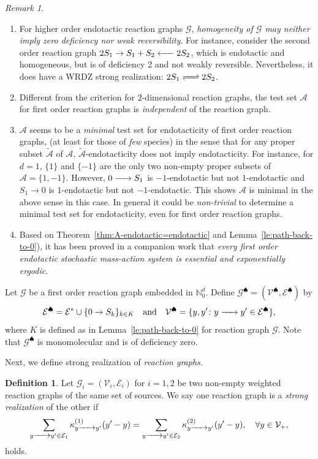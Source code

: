 \documentclass[10pt]{amsart}
\numberwithin{equation}{section}
\theoremstyle{plain}
\theoremstyle{definition}
\newtheorem{definition}[theorem]{Definition}
\theoremstyle{remark}
\newtheorem{remark}[theorem]{Remark}
\newcommand{\cA}{\mathcal{A}}
\newcommand{\cE}{\mathcal{E}}
\newcommand{\cG}{\mathcal{G}}
\newcommand{\cV}{\mathcal{V}}
\begin{document}
\begin{remark}\label{re:A-endotactic=endotactic}
\begin{enumerate}
\item[(i)] For higher order endotactic reaction graphs $\cG$, \emph{homogeneity of $\cG$ may neither imply zero deficiency nor weak reversibility}. For instance, consider the second order reaction graph $2S_1\to S_1+S_2\ce{<-[]} 2S_2$, which is endotactic and homogeneous, but is of deficiency 2 and not weakly reversible. Nevertheless, it does have a WRDZ strong realization: $2S_1\ce{<=>[][]}2S_2$.
\item[(ii)] Different from the criterion \cite[Proposition~4.1]{CNP13} for $2$-dimensional   reaction graphs, the test set $\mathcal{A}$ for first order reaction graphs is \emph{independent} of the reaction graph.
\item[(iii)] $\cA$ seems to be a \emph{minimal} test set for endotacticity of first order reaction graphs, (at least for those of \emph{few} species) in the sense that for any proper subset $\widetilde{\cA}$ of $\cA$, $\widetilde{\cA}$-endotacticity does not imply endotacticity. For instance, for $d=1$, $\{1\}$ and $\{-1\}$ are the only two non-empty proper subsets of $\cA=\{1,-1\}$. However, $0\ce{->[]} S_1$ is $-1$-endotactic but not $1$-endotactic and $S_1\to 0$ is $1$-endotactic but not $-1$-endotactic. This shows $\cA$ is minimal in the above sense in this case. In general it could be \emph{non-trivial} to determine a minimal test set for endotacticity, even for first order reaction graphs.
\item[(iv)] Based on Theorem~\ref{thm:A-endotactic=endotactic} and Lemma~\ref{le:path-back-to-0}),  it has been proved in a companion work \cite{X24b} that \emph{every first order endotactic stochastic mass-action system is essential and exponentially ergodic}.
\end{enumerate}\end{remark}


Let $\cG$ be a first order reaction graph embedded in $\mathbb{N}^d_0$. Define $\cG^{\spadesuit}=(\cV^{\spadesuit},\cE^{\spadesuit})$ by $$\cE^{\spadesuit}=\cE^*\cup\{0\to S_k\}_{k\in K}\quad \text{and}\quad \cV^{\spadesuit}=\{y,y'\colon y\ce{->[]} y'\in\cE^{\spadesuit}\},$$  where  $K$ is defined as in  Lemma~\ref{le:path-back-to-0} for reaction graph $\mathcal{G}$.  Note that $\cG^{\spadesuit}$ is monomolecular and is of deficiency zero. 


Next, we define strong realization of \emph{reaction graphs}.
\begin{definition}\label{def:weighted-graph-equivalence}
Let $\cG_i=(\cV_i,\cE_i)$ for $i=1,2$ be two non-empty  weighted  reaction graphs of the same set of sources. We say one reaction graph is a \emph{strong realization} of the other if \begin{equation}\label{eq:rate-constant-source-outflux}
\sum_{y\ce{->[]} y'\in\cE_1}\kappa_{y\ce{->[]} y'}^{(1)}(y'-y) = \sum_{y\ce{->[]} y'\in\cE_2}\kappa_{y\ce{->[]} y'}^{(2)}(y'-y),\quad \forall y\in\cV_+,
\end{equation} holds.
\end{definition}
\end{document}
